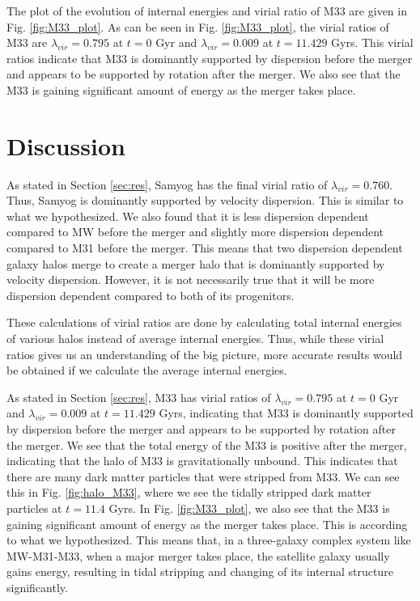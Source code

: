 \documentclass[twocolumn]{aastex631}
\begin{document}
The plot of the evolution of internal energies and virial ratio of M33 are given in Fig. \ref{fig:M33_plot}. As can be seen in Fig. \ref{fig:M33_plot}, the virial ratios of M33 are $\lambda_{vir} = 0.795$ at $t=0$ Gyr and $\lambda_{vir} = 0.009$ at $t=11.429$ Gyrs. This virial ratios indicate that M33 is dominantly supported by dispersion before the merger and appears to be supported by rotation after the merger. We also see that the M33 is gaining significant amount of energy as the merger takes place. 

\section{Discussion}
\label{sec:disc}
As stated in Section \ref{sec:res}, Samyog has the final virial ratio of $\lambda_{vir} = 0.760$. Thus, Samyog is dominantly supported by velocity dispersion. This is similar to what we hypothesized. We also found that it is less dispersion dependent compared to MW before the merger and slightly more dispersion dependent compared to M31 before the merger. This means that two dispersion dependent galaxy halos merge to create a merger halo that is dominantly supported by velocity dispersion. However, it is not necessarily true that it will be more dispersion dependent compared to both of its progenitors. 

These calculations of virial ratios are done by calculating total internal energies of various halos instead of average internal energies. Thus, while these virial ratios gives us an understanding of the big picture, more accurate results would be obtained if we calculate the average internal energies.

As stated in Section \ref{sec:res}, M33 has virial ratios of $\lambda_{vir} = 0.795$ at $t=0$ Gyr and $\lambda_{vir} = 0.009$ at $t=11.429$ Gyrs, indicating that M33 is dominantly supported by dispersion before the merger and appears to be supported by rotation after the merger. We see that the total energy of the M33 is positive after the merger, indicating that the halo of M33 is gravitationally unbound. This indicates that there are many dark matter particles that were stripped from M33. We can see this in Fig. \ref{fig:halo_M33}, where we see the tidally stripped dark matter particles at $t=11.4$ Gyrs. In Fig. \ref{fig:M33_plot}, we also see that the M33 is gaining significant amount of energy as the merger takes place. This is according to what we hypothesized. This means that, in a three-galaxy complex system like MW-M31-M33, when a major merger takes place, the satellite galaxy usually gains energy, resulting in tidal stripping and changing of its internal structure significantly. 
\end{document}

